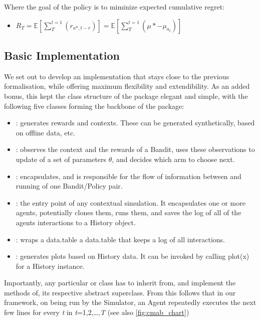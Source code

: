 \documentclass[nojss]{jss}\usepackage[]{graphicx}\usepackage[]{color}
\begin{document}
Where the goal of the policy is to miminize expected cumulative regret:

\begin{itemize}
         \item \( R_{T} = \mathbb{E}\left[ \textstyle \sum_{T}^{t=1}(r_{a*,t-r}) \right] = \mathbb{E}\left[ \textstyle \sum_{T}^{t=1}(\mu*-\mu_{a_{t}}) \right] \)
\end{itemize}

\subsection{Basic Implementation}

We set out to develop an implementation that stays close to the previous formalisation, while offering maximum flexibility and extendibility. As an added bonus, this kept the class structure of the package elegant and simple, with the following five classes forming the backbone of the package:

\begin{itemize}
         \item {}: generates rewards and contexts. These can be generated synthetically, based on offline data, etc.
         \item {}: observes the context and the rewards of a Bandit, uses these observations to update of a set of parameters $\theta$, and decides which arm to choose next.
         \item {}: encapsulates, and is responsible for the flow of information between and running of one Bandit/Policy pair.
         \item {}: the entry point of any contextual simulation. It encapsulates one or more agents, potentially clones them, runs them, and saves the log of all of the agents interactions to a History object.
         \item {}: wraps a data.table a data.table that keeps a log of all interactions.
         \item {}: generates plots based on History data. It can be invoked by calling plot(x) for a History instance.
\end{itemize}

Importantly, any particular  or  class has to inherit from, and implement the methods of, its respective abstract superclass. From this follows that in our framework, on being run by the Simulator, an Agent repeatedly executes the next few lines for every \textit{t} in \textit{t}=1,2,{\dots},\textit{T} (see also \ref{fig:cmab_chart})
\end{document}
